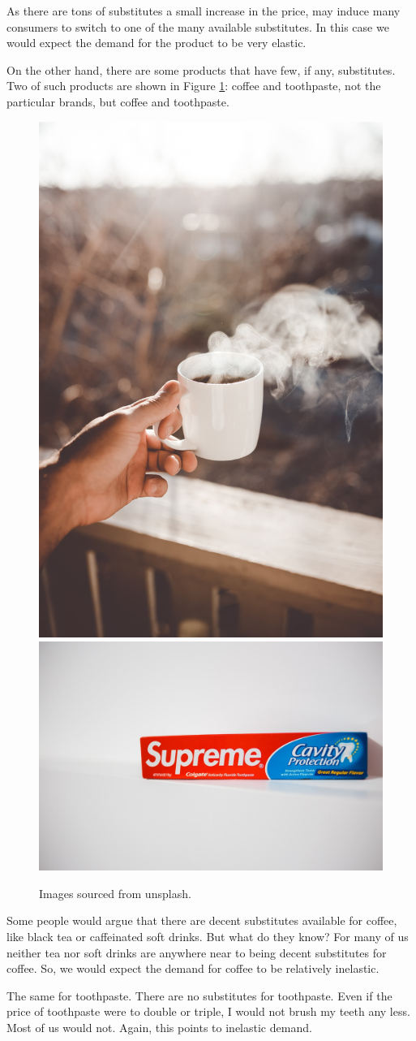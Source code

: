 \documentclass[
]{book}
\begin{document}
As there are tons of substitutes a small increase in the price, may induce many consumers to switch to one of the many available substitutes. In this case we would expect the demand for the product to be very elastic.

On the other hand, there are some products that have few, if any, substitutes. Two of such products are shown in Figure \ref{fig:fig306}: coffee and toothpaste, not the particular brands, but coffee and toothpaste.

\begin{figure}

{\centering \includegraphics[width=0.45\linewidth]{img/ch3/fig6} \includegraphics[width=0.45\linewidth]{img/ch3/fig6b} 

}

\caption{Images sourced from unsplash.}\label{fig:fig306}
\end{figure}

Some people would argue that there are decent substitutes available for coffee, like black tea or caffeinated soft drinks. But what do they know? For many of us neither tea nor soft drinks are anywhere near to being decent substitutes for coffee. So, we would expect the demand for coffee to be relatively inelastic.

The same for toothpaste. There are no substitutes for toothpaste. Even if the price of toothpaste were to double or triple, I would not brush my teeth any less. Most of us would not. Again, this points to inelastic demand.
\end{document}

